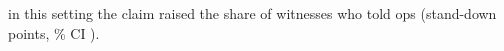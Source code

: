 in this setting the claim raised the share of witnesses who told ops (stand-down \wtthHaikuHOneDelta{} points, \wtthProtocolLevel\% CI \wtthHaikuHOneCI).
